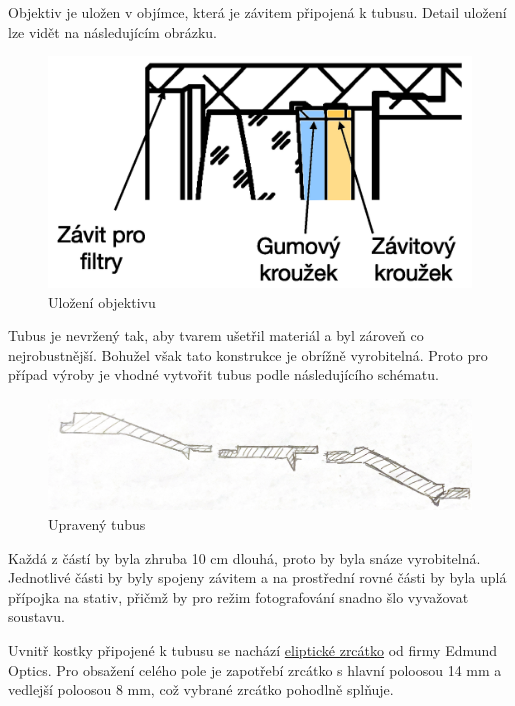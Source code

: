 \documentclass[
]{article}
\begin{document}
Objektiv je uložen v objímce, která je závitem připojená k tubusu.
Detail uložení lze vidět na následujícím obrázku.

\begin{figure}
\centering
\includegraphics{imgs/ulozeni_objektivu.png}
\caption{Uložení objektivu}
\end{figure}

Tubus je nevržený tak, aby tvarem ušetřil materiál a byl zároveň co
nejrobustnější. Bohužel však tato konstrukce je obrížně vyrobitelná.
Proto pro případ výroby je vhodné vytvořit tubus podle následujícího
schématu.

\begin{figure}
\centering
\includegraphics{imgs/vylepseny_tubus.png}
\caption{Upravený tubus}
\end{figure}

Každá z částí by byla zhruba 10 cm dlouhá, proto by byla snáze
vyrobitelná. Jednotlivé části by byly spojeny závitem a na prostřední
rovné části by byla uplá přípojka na stativ, přičmž by pro režim
fotografování snadno šlo vyvažovat soustavu.

Uvnitř kostky připojené k tubusu se nachází
\href{https://www.edmundoptics.com/p/elliptical-mirror-2223mm-minor-axis-protected-aluminum/1919/}{eliptické
zrcátko} od firmy Edmund Optics. Pro obsažení celého pole je zapotřebí
zrcátko s hlavní poloosou 14 mm a vedlejší poloosou 8 mm, což vybrané
zrcátko pohodlně splňuje.
\end{document}
